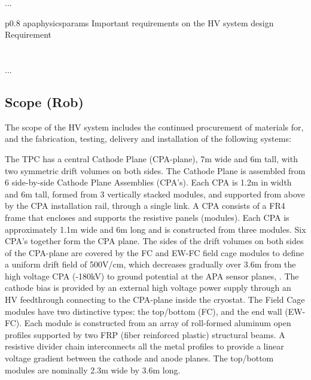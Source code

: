 ...


\begin{dunetable}
{p{0.8\textwidth}}
{apaphysicsparams}
{Important requirements on the HV system design}   
Requirement  \\ \toprowrule
  \\ \colhline
   \\ \colhline
 ...\\ 
\end{dunetable}



\subsection{Scope (Rob)}
\label{sec:fdsp-hv-scope}

The scope of the HV system includes the continued procurement of materials for, and the fabrication, testing, delivery and installation of the following systems: 

The TPC has a central Cathode Plane (CPA-plane), 7m wide and 6m tall, with two symmetric drift volumes on both sides. The Cathode Plane is assembled from 6 side-by-side Cathode Plane Assemblies (CPA's). Each CPA is 1.2m in width and 6m tall, formed from 3 vertically stacked modules, and supported from above by the CPA installation rail, through a single link.
A CPA consists of a FR4 frame that encloses and supports the resistive panels (modules).  Each CPA is approximately 1.1m wide and 6m long and is constructed from three modules.  Six CPA's together form the CPA plane. 
The sides of the drift volumes on both sides of the CPA-plane are covered by the FC and EW-FC field cage modules to define a uniform drift field of 500V/cm, which decreases gradually over 3.6m from the high voltage CPA (-180kV) to ground potential at the APA sensor planes, . The cathode bias is provided by an external high voltage power supply through an HV feedthrough connecting to the CPA-plane inside the cryostat.
The Field Cage modules have two distinctive types: the top/bottom (FC), and the end wall (EW-FC). Each module is constructed from an array of roll-formed aluminum open profiles supported by two FRP (fiber reinforced plastic) structural beams. A resistive divider chain interconnects all the metal profiles to provide a linear voltage gradient between the cathode and anode planes.  The top/bottom modules are nominally 2.3m wide by 3.6m long. 

